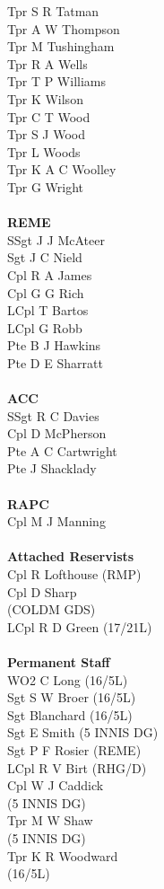 \begin{multicols}{3}
  Tpr S R Tatman \\
  Tpr A W Thompson \\
  Tpr M Tushingham \\
  Tpr R A Wells \\
  Tpr T P Williams \\
  Tpr K Wilson \\
  Tpr C T Wood \\
  Tpr S J Wood \\
  Tpr L Woods \\
  Tpr K A C Woolley \\
  Tpr G Wright \\
  \\
  \textbf{REME} \\
  SSgt J J McAteer \\
  Sgt J C Nield \\
  Cpl R A James \\
  Cpl G G Rich \\
  LCpl T Bartos \\
  LCpl G Robb \\
  Pte B J Hawkins \\
  Pte D E Sharratt \\
  \\
  \textbf{ACC} \\
  SSgt R C Davies \\
  Cpl D McPherson \\
  Pte A C Cartwright \\
  Pte J Shacklady \\
  \\
  \textbf{RAPC} \\
  Cpl M J Manning \\
  \\
  \textbf{Attached Reservists} \\
  Cpl R Lofthouse (RMP) \\
  Cpl D Sharp \\ \indent (COLDM GDS) \\
  LCpl R D Green (17/21L) \\
  \\
  \textbf{Permanent Staff} \\
  WO2 C Long (16/5L) \\
  Sgt S W Broer (16/5L) \\
  Sgt Blanchard (16/5L) \\
  Sgt E Smith (5 INNIS DG) \\
  Sgt P F Rosier (REME) \\
  LCpl R V Birt (RHG/D) \\
  Cpl W J Caddick \\ \indent (5 INNIS DG) \\
  Tpr M W Shaw \\ \indent (5 INNIS DG) \\
  Tpr K R Woodward \\ \indent (16/5L) \\
\end{multicols}
